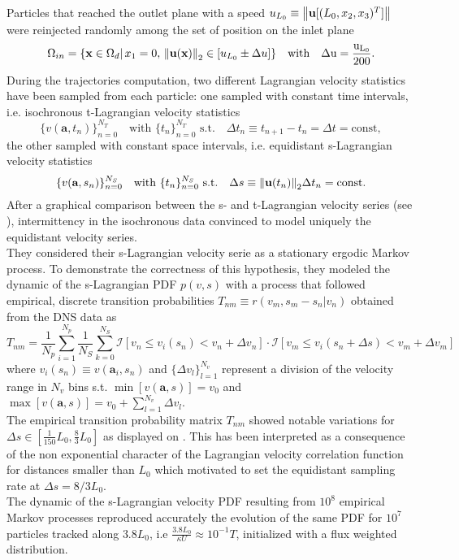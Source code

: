 Particles that reached the outlet plane with a speed $u_{L_0}\equiv\norm{\textbf{u}[(L_0,x_2,x_3)^T]}$ were reinjected randomly among the set of position on the inlet plane
\[
\Omega_{in}=\{\textbf{x}\in\Omega_d|\,x_1=0,\,\norm{\textbf{u}(\textbf{x})}_2\in[u_{L_0}\pm\Delta u]\}\quad\rm{with}\quad \Delta u=\frac{u_{L_0}}{200}.
\]
During the trajectories computation, two different Lagrangian velocity statistics have been sampled from each particle: one sampled with constant time intervals, i.e. isochronous t-Lagrangian velocity statistics
\[
\{v(\textbf{a},t_{n})\}_{n=0}^{N_T}\quad\textrm{with $\{t_n\}_{n=0}^{N_T}$ s.t.}\quad \Delta t_n\equiv t_{n+1}-t_n = \Delta t=\mathrm{const},
\] 
the other sampled with constant space intervals, i.e. equidistant s-Lagrangian velocity statistics
\[\{v(\textbf{a},s_{n})\}_{n=0}^{N_S}\quad\textrm{with $\{t_n\}_{n=0}^{N_S}$ s.t.}\quad \Delta s \equiv\norm{\textbf{u}(t_n)}_2\Delta t_n = \mathrm{const}.
\]
After a graphical comparison between the s- and t-Lagrangian velocity series (see \citet[Fig. 2]{Puyguiraud2019}), intermittency in the isochronous data convinced \citeauthor{Puyguiraud2019} to model uniquely the equidistant velocity series.\\
They considered their s-Lagrangian velocity serie as a stationary ergodic Markov process. 
To demonstrate the correctness of this hypothesis, they modeled the dynamic of the s-Lagrangian PDF $p(v,s)$ with a process that followed empirical, discrete transition probabilities $T_{nm}\equiv r(v_m,s_m-s_n|v_n)$ obtained from the DNS data as
\[
T_{nm}=\frac{1}{N_p}\sum_{i=1}^{N_p}\frac{1}{N_S}\sum_{k=0}^{N_S}\mathcal{I}[v_n \leq v_i(s_n) < v_n + \Delta v_n]\cdot\mathcal{I}[v_m \leq v_i(s_n+\Delta s) < v_m + \Delta v_m]
\]
where $v_i(s_n)\equiv v(\textbf{a}_i,s_n)$ and $\{\Delta v_l\}_{l=1}^{N_v}$ represent a division of the velocity range in $N_v$ bins s.t. $\min[v(\textbf{a},s)]=v_0$ and $\max[v(\textbf{a},s)]=v_{0}+\sum_{l=1}^{N_v}\Delta v_l$.\\
The empirical transition probability matrix $T_{nm}$ showed notable variations for $\Delta s\in[\frac{1}{150}L_0,\frac{8}{3}L_0]$ as displayed on \citet[Fig. 7]{Puyguiraud2019}. 
This has been interpreted as a consequence of the non exponential character of the Lagrangian velocity correlation function for distances smaller than $L_0$ which motivated \citeauthor{Puyguiraud2019} to set the equidistant sampling rate at $\Delta s = 8/3 L_0$.\\
The dynamic of the s-Lagrangian velocity PDF resulting from $10^8$ empirical Markov processes reproduced accurately the evolution of the same PDF for $10^7$ particles tracked along $3.8L_0$, i.e $\frac{3.8L_0}{\kappa U}\approx 10^{-1}T$, initialized with a flux weighted distribution.\\
